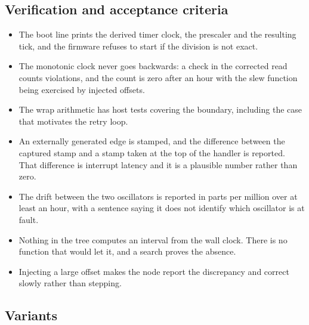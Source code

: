 \subsection*{Verification and acceptance criteria}

\begin{itemize}
\item The boot line prints the derived timer clock, the prescaler and the
resulting tick, and the firmware refuses to start if the division is not exact.
\item The monotonic clock never goes backwards: a check in the corrected read
counts violations, and the count is zero after an hour with the slew function
being exercised by injected offsets.
\item The wrap arithmetic has host tests covering the boundary, including the
case that motivates the retry loop.
\item An externally generated edge is stamped, and the difference between the
captured stamp and a stamp taken at the top of the handler is reported. That
difference is interrupt latency and it is a plausible number rather than zero.
\item The drift between the two oscillators is reported in parts per million
over at least an hour, with a sentence saying it does not identify which
oscillator is at fault.
\item Nothing in the tree computes an interval from the wall clock. There is no
function that would let it, and a search proves the absence.
\item Injecting a large offset makes the node report the discrepancy and correct
slowly rather than stepping.
\end{itemize}

\subsection*{Variants}

